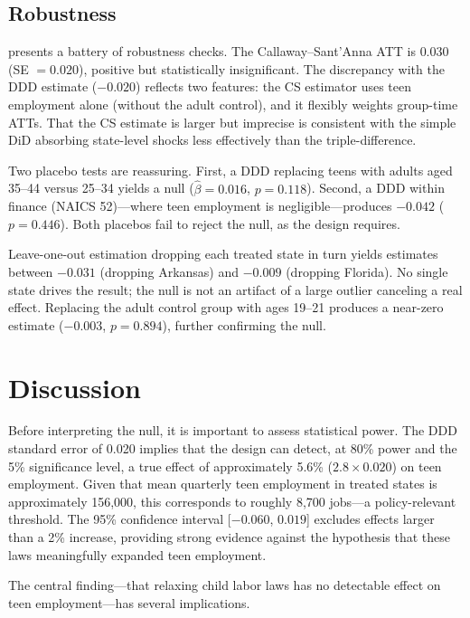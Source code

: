 \documentclass[12pt]{article}
\begin{document}
\subsection{Robustness}



 presents a battery of robustness checks. The Callaway--Sant'Anna ATT is $0.030$ (SE $= 0.020$), positive but statistically insignificant. The discrepancy with the DDD estimate ($-0.020$) reflects two features: the CS estimator uses teen employment alone (without the adult control), and it flexibly weights group-time ATTs. That the CS estimate is larger but imprecise is consistent with the simple DiD absorbing state-level shocks less effectively than the triple-difference.

Two placebo tests are reassuring. First, a DDD replacing teens with adults aged 35--44 versus 25--34 yields a null ($\hat{\beta} = 0.016$, $p = 0.118$). Second, a DDD within finance (NAICS 52)---where teen employment is negligible---produces $-0.042$ ($p = 0.446$). Both placebos fail to reject the null, as the design requires.

Leave-one-out estimation dropping each treated state in turn yields estimates between $-0.031$ (dropping Arkansas) and $-0.009$ (dropping Florida). No single state drives the result; the null is not an artifact of a large outlier canceling a real effect. Replacing the adult control group with ages 19--21 produces a near-zero estimate ($-0.003$, $p = 0.894$), further confirming the null.


\section{Discussion}
\label{sec:discussion}

Before interpreting the null, it is important to assess statistical power. The DDD standard error of 0.020 implies that the design can detect, at 80\% power and the 5\% significance level, a true effect of approximately 5.6\% ($2.8 \times 0.020$) on teen employment. Given that mean quarterly teen employment in treated states is approximately 156,000, this corresponds to roughly 8,700 jobs---a policy-relevant threshold. The 95\% confidence interval [$-0.060$, $0.019$] excludes effects larger than a 2\% increase, providing strong evidence against the hypothesis that these laws meaningfully expanded teen employment.

The central finding---that relaxing child labor laws has no detectable effect on teen employment---has several implications.
\end{document}
